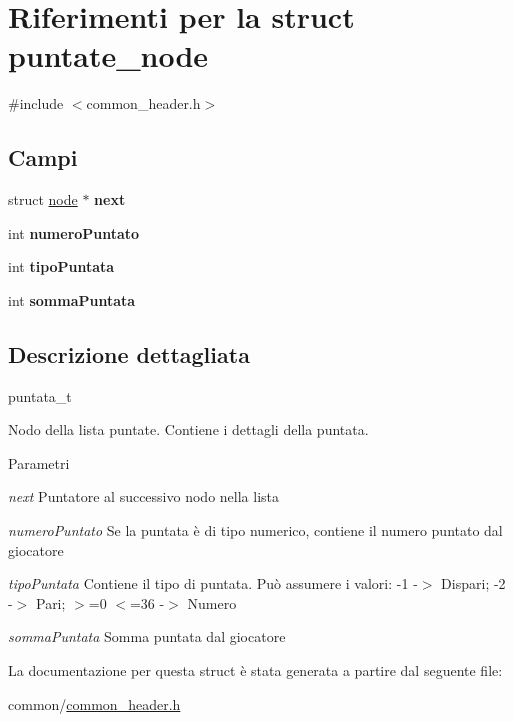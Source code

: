 \hypertarget{structpuntate__node}{
\section{Riferimenti per la struct puntate\_\-node}
\label{structpuntate__node}
}


{\ttfamily \#include $<$common\_\-header.h$>$}

\subsection*{Campi}
\begin{DoxyCompactItemize}
\item 
\hypertarget{structpuntate__node_a84cf85254ed00cb71dc354b37a575574}{
struct \hyperlink{structnode__tag}{node} $\ast$ {\bfseries next}}
\label{structpuntate__node_a84cf85254ed00cb71dc354b37a575574}

\item 
\hypertarget{structpuntate__node_a45950451963cb96dcd5ace153695747c}{
int {\bfseries numeroPuntato}}
\label{structpuntate__node_a45950451963cb96dcd5ace153695747c}

\item 
\hypertarget{structpuntate__node_ab30149e55eb9f28f2420a368a1dc6d43}{
int {\bfseries tipoPuntata}}
\label{structpuntate__node_ab30149e55eb9f28f2420a368a1dc6d43}

\item 
\hypertarget{structpuntate__node_a873560fb24674f10db457f0f5fafa570}{
int {\bfseries sommaPuntata}}
\label{structpuntate__node_a873560fb24674f10db457f0f5fafa570}

\end{DoxyCompactItemize}


\subsection{Descrizione dettagliata}
puntata\_\-t

Nodo della lista puntate. Contiene i dettagli della puntata. 
\begin{DoxyParams}{Parametri}
\item[{\em next}]Puntatore al successivo nodo nella lista \item[{\em numeroPuntato}]Se la puntata è di tipo numerico, contiene il numero puntato dal giocatore \item[{\em tipoPuntata}]Contiene il tipo di puntata. Può assumere i valori: -\/1 -\/$>$ Dispari; -\/2 -\/$>$ Pari; $>$=0 $<$=36 -\/$>$ Numero \item[{\em sommaPuntata}]Somma puntata dal giocatore \end{DoxyParams}


La documentazione per questa struct è stata generata a partire dal seguente file:\begin{DoxyCompactItemize}
\item 
common/\hyperlink{common__header_8h}{common\_\-header.h}\end{DoxyCompactItemize}
